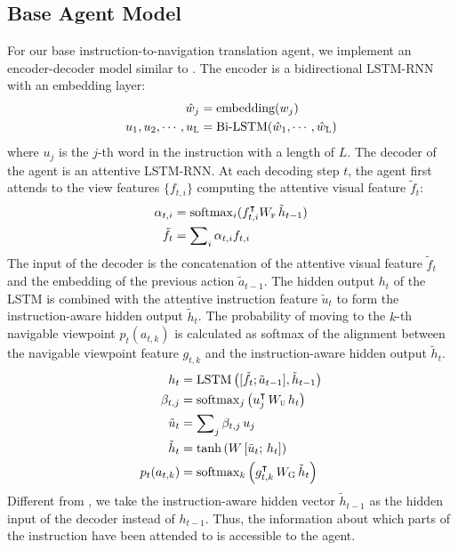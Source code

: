\documentclass[11pt,a4paper]{article}
\begin{document}
\subsection{Base Agent Model}
\label{sec:model} 
For our base instruction-to-navigation translation agent, we implement an encoder-decoder model similar to . 
The encoder is a bidirectional LSTM-RNN with an embedding layer:
\vspace{-5pt}
\begin{align}
\hat{w}_j &= \mbox{embedding}(w_j) \\ 
u_1, u_2, \cdots, u_\textsc{L} &= \mathrm{Bi\mbox{-}LSTM} (\hat{w}_1, \cdots, \hat{w}_\textsc{L})
\vspace{-10pt}
\end{align} 
where $u_j$ is the $j$-th word in the instruction with a length of $L$.
The decoder of the agent is an attentive LSTM-RNN. 
At each decoding step $t$, the agent first attends to the view features $\{f_{t,i}\}$ computing the attentive visual feature $\tilde{f}_t$:
\vspace{-5pt}
\begin{align}
\alpha_{t,i} &= \mathrm{softmax}_i(f_{t,i}^\intercal W_\textsc{f} \, \tilde{h}_{t-1}) \\
\tilde f_t &= \sum\nolimits_i \alpha_{t,i} f_{t,i}
\vspace{-5pt}
\end{align}
The input of the decoder is the concatenation of the attentive visual feature $\tilde{f}_t$ and the embedding of the previous action $\tilde{a}_{t-1}$. 
The hidden output $h_t$ of the LSTM is combined with the attentive instruction feature $\tilde u_t$ to form the instruction-aware hidden output $\tilde h_t$. 
The probability of moving to the $k$-th navigable viewpoint $p_t(a_{t,k})$ is calculated as softmax of the alignment between the navigable viewpoint feature $g_{t,k}$ and the instruction-aware hidden output $\tilde h_t$.
\begin{align}
h_t & = \mathrm{LSTM}\left([ \tilde f_t;\tilde a_{t-1}], \tilde h_{t-1}\right) \\
\beta_{t,j} &= \mathrm{softmax}_j \left(u_j ^\intercal \, W_\textsc{u}\, h_t\right) \\
\tilde u_t & = \sum\nolimits_j \beta_{t,j}\, u_j \\
\tilde h_t &= \tanh \left(W \left[\tilde u_t ; \, h_t \right]\right) \\ 
p_t(a_{t,k}) & = \mathrm{softmax}_k \left(g_{t, k}^\intercal \,W_\textsc{G}\, \tilde h_t\right) 
\end{align}
Different from , we take the instruction-aware hidden vector $\tilde h_{t-1}$ as the hidden input of the decoder instead of $h_{t-1}$. 
Thus, the information about which parts of the instruction have been attended to is accessible to the agent. 
\end{document}

